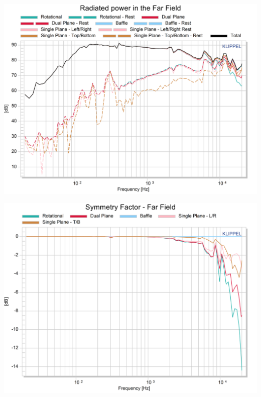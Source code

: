 \documentclass{report}
\begin{document}
\begin{minipage}{0.5\textwidth}
\begin{center}
	\includegraphics[width=\textwidth]{Sym/Rad_Pow_10cmWoofer} 
    \captionsetup{hypcap=false} 
	\label{fig:rad_pow_10cm}
\end{center}
\end{minipage}
\begin{minipage}{0.5\textwidth}
\begin{center}
	\includegraphics[width=\textwidth]{Sym/Sym_Fact_10cmWoofer} 
    \captionsetup{hypcap=false} 
	\label{fig:sym_fact_10cm}
\end{center}
\end{minipage}
\vspace{0.1cm}
\end{document}
